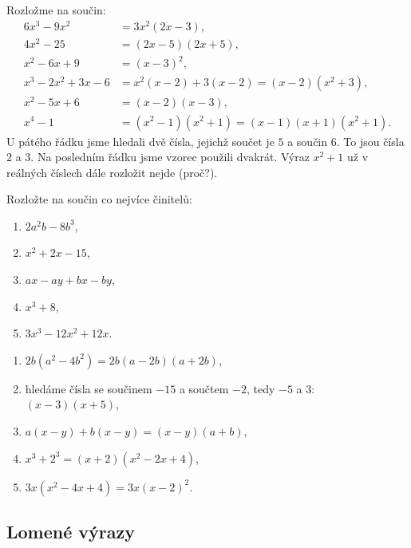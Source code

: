 \begin{example}
  Rozložme na součin:
  \begin{align*}
    6x^3 - 9x^2 &= 3x^2(2x - 3),\\
    4x^2 - 25 &= (2x - 5)(2x + 5),\\
    x^2 - 6x + 9 &= {(x - 3)}^2,\\
    x^3 - 2x^2 + 3x - 6 &= x^2(x - 2) + 3(x - 2) = (x - 2)(x^2 + 3),\\
    x^2 - 5x + 6 &= (x - 2)(x - 3),\\
    x^4 - 1 &= (x^2 - 1)(x^2 + 1) = (x - 1)(x + 1)(x^2 + 1).
  \end{align*}
  U pátého řádku jsme hledali dvě čísla, jejichž součet je $5$ a součin $6$. To jsou čísla $2$ a $3$. Na posledním řádku jsme vzorec použili dvakrát. Výraz $x^2 + 1$ už v reálných číslech dále rozložit nejde (proč?).
\end{example}

\begin{problem}
  Rozložte na součin co nejvíce činitelů:
  \begin{enumerate}[label=(\alph*)]
    \item $2a^2b - 8b^3$,
    \item $x^2 + 2x - 15$,
    \item $ax - ay + bx - by$,
    \item $x^3 + 8$,
    \item $3x^3 - 12x^2 + 12x$.
  \end{enumerate}
\end{problem}

\begin{solution}
  \begin{enumerate}[label=(\alph*)]
    \item $2b(a^2 - 4b^2) = 2b(a - 2b)(a + 2b)$,
    \item hledáme čísla se součinem $-15$ a součtem $-2$, tedy $-5$ a $3$: $(x - 3)(x + 5)$,
    \item $a(x - y) + b(x - y) = (x - y)(a + b)$,
    \item $x^3 + 2^3 = (x + 2)(x^2 - 2x + 4)$,
    \item $3x(x^2 - 4x + 4) = 3x{(x - 2)}^2$.
  \end{enumerate}
\end{solution}

\subsection{Lomené výrazy}\label{sec:lomene-vyrazy}

